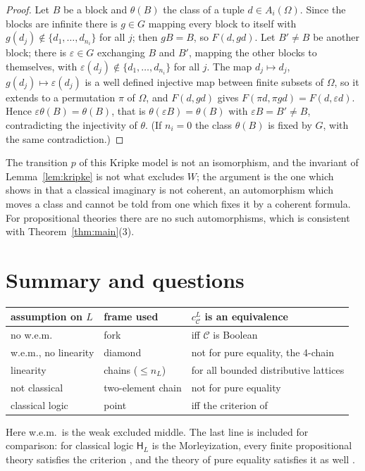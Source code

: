 \documentclass[11pt]{amsart}
\theoremstyle{definition}
\newcommand{\HH}{\mathsf H}
\newcommand{\cC}{\mathcal C}
\begin{document}
\begin{proof}
Let $B$ be a block and $\theta(B)$ the class of a tuple $d\in
A_i(\Omega)$. Since the blocks are infinite there is $g\in G$ mapping
every block to itself with $g(d_j)\notin\{d_1,\dots,d_{n_i}\}$ for all
$j$; then $gB=B$, so $F(d,gd)$. Let $B'\ne B$ be another block; there
is $\varepsilon\in G$ exchanging $B$ and $B'$, mapping the other
blocks to themselves, with $\varepsilon(d_j)\notin\{d_1,\dots,
d_{n_i}\}$ for all $j$. The map $d_j\mapsto d_j$, $g(d_j)\mapsto
\varepsilon(d_j)$ is a well defined injective map between finite
subsets of $\Omega$, so it extends to a permutation $\pi$ of $\Omega$,
and $F(d,gd)$ gives $F(\pi d,\pi gd)=F(d,\varepsilon d)$. Hence
$\varepsilon\theta(B)=\theta(B)$, that is $\theta(\varepsilon B)=
\theta(B)$ with $\varepsilon B=B'\ne B$, contradicting the injectivity
of $\theta$. (If $n_i=0$ the class $\theta(B)$ is fixed by $G$, with
the same contradiction.)
\end{proof}

The transition $p$ of this Kripke model is not an isomorphism, and the
invariant of Lemma~\ref{lem:kripke} is not what excludes $W$; the
argument is the one which shows in \cite[Thm.~5.3]{Morley} that a
classical imaginary is not coherent, an automorphism which moves a
class and cannot be told from one which fixes it by a coherent
formula. For propositional theories there are no such automorphisms,
which is consistent with Theorem~\ref{thm:main}(3).

\section{Summary and questions}

\begin{center}
\small\begin{tabular}{l|l|l}
assumption on $L$ & frame used & $c^L_\cC$ is an equivalence\\\hline
no w.e.m. & fork & iff $\cC$ is Boolean\\
w.e.m., no linearity & diamond & not for pure equality, the 4-chain\\
linearity & chains ($\le n_L$) & for all bounded distributive lattices\\
not classical & two-element chain & not for pure equality\\
classical logic & point & iff the criterion of \cite[Thm.~6.1]{Morley}
\end{tabular}
\end{center}

Here w.e.m.\ is the weak excluded middle. The last line is included for comparison: for classical logic
$\HH_L$ is the Morleyization, every finite propositional theory
satisfies the criterion \cite[Prop.~5.2]{Morley}, and the theory of
pure equality satisfies it as well \cite[Ex.~6.5]{Morley}.
\end{document}
